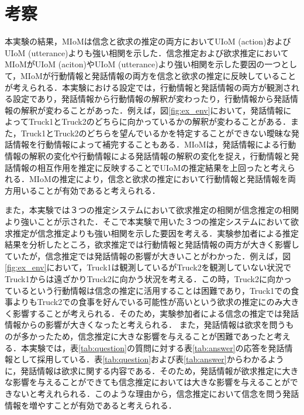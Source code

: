 \chapter{考察}
\par
本実験の結果，MIoMは信念と欲求の推定の両方においてUIoM (action)およびUIoM (utterance)よりも強い相関を示した．信念推定および欲求推定においてMIoMがUIoM (aciton)やUIoM (utterance)より強い相関を示した要因の一つとして，MIoMが行動情報と発話情報の両方を信念と欲求の推定に反映していることが考えられる．本実験における設定では，行動情報と発話情報の両方が観測される設定であり，発話情報から行動情報の解釈が変わったり，行動情報から発話情報の解釈が変わることがあった．例えば，図\ref{fig:ex_env}において，発話情報によってTruck1とTruck2のどちらに向かっているかの解釈が変わることがある．また，Truck1とTruck2のどちらを望んでいるかを特定することができない曖昧な発話情報を行動情報によって補完することもある．MIoMは，発話情報による行動情報の解釈の変化や行動情報による発話情報の解釈の変化を捉え，行動情報と発話情報の相互作用を推定に反映することでUIoMの推定結果を上回ったと考えられる．MIoMの推定により，信念と欲求の推定において行動情報と発話情報を両方用いることが有効であると考えられる．

\par
また，本実験では３つの推定システムにおいて欲求推定の相関が信念推定の相関より強いことが示された．そこで本実験で用いた３つの推定システムにおいて欲求推定が信念推定よりも強い相関を示した要因を考える．実験参加者による推定結果を分析したところ，欲求推定では行動情報と発話情報の両方が大きく影響していたが，信念推定では発話情報の影響が大きいことがわかった．例えば，図\ref{fig:ex_env}において，Truck1は観測しているがTruck2を観測していない状況でTruck1からは遠ざかりTruck2に向かう状況を考える．この時，Truck2に向かっているという行動情報は信念の推定に活用することは困難であり，Truck1での食事よりもTruck2での食事を好んでいる可能性が高いという欲求の推定にのみ大きく影響することが考えられる．そのため，実験参加者による信念の推定では発話情報からの影響が大きくなったと考えられる．
また，発話情報は欲求を問うものが多かったため，信念推定に大きな影響を与えることが困難であったと考える．本実験では，表\ref{tab:question}の質問に対する表\ref{tab:answer}の応答を発話情報として採用している．表\ref{tab:question}および表\ref{tab:answer}からわかるように，発話情報は欲求に関する内容である．そのため，発話情報が欲求推定に大きな影響を与えることができても信念推定においては大きな影響を与えることができないと考えれられる．このような理由から，信念推定において信念を問う発話情報を増やすことが有効であると考えられる．
